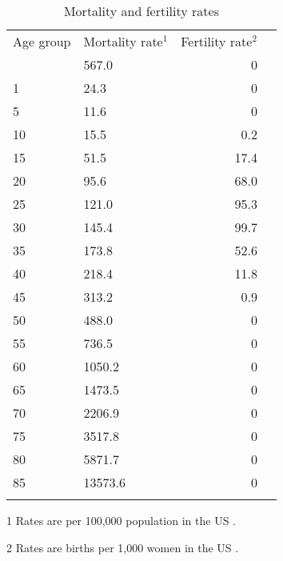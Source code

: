 \renewcommand{\arraystretch}{1.0}
\begin{table}[htp]
\centering
\begin{threeparttable}
\setlength{\tabcolsep}{30pt}
\footnotesize
\caption{Mortality and fertility rates} \label{ch04:rates}
\begin{tabular}{llrr}
\hline
\addlinespace
Age group	& Mortality rate$^1$  & Fertility rate$^2$  \\
\addlinespace
\hline
\addlinespace
0	& 567.0	    & 0	     \\
1	& 24.3	    & 0	     \\
5	& 11.6	    & 0	     \\
10	& 15.5	    & 0.2    \\
15	& 51.5	    & 17.4	 \\
20	& 95.6	    & 68.0	 \\
25	& 121.0	    & 95.3	 \\
30	& 145.4	    & 99.7	 \\
35	& 173.8	    & 52.6	 \\
40	& 218.4	    & 11.8	 \\
45	& 313.2	    & 0.9	 \\
50	& 488.0	    & 0	     \\
55	& 736.5	    & 0	     \\
60	& 1050.2	& 0	     \\
65	& 1473.5	& 0	     \\
70	& 2206.9	& 0	     \\
75	& 3517.8	& 0	     \\
80	& 5871.7	& 0	     \\
85	& 13573.6	& 0	     \\
\addlinespace
\hline
\addlinespace
\end{tabular}
   \begin{tablenotes}
      \scriptsize
       \item[1] Rates are per 100,000 population in the US \citep[Table 2, pg. 24]{kochanek2019}.
       \item[2] Rates are births per 1,000 women in the US \citep[Table 2, pg. 13]{martin2019}.
    \end{tablenotes}
  \end{threeparttable}
\end{table}